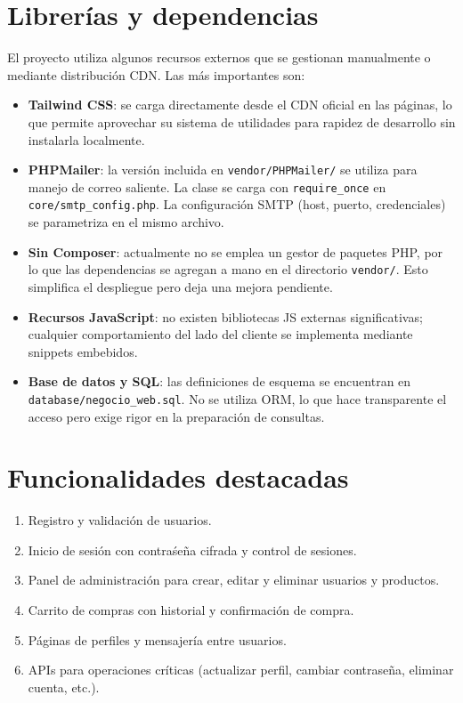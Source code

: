 \documentclass[a4paper,12pt]{article}
\begin{document}
\section{Librer\'ias y dependencias}
El proyecto utiliza algunos recursos externos que se gestionan manualmente o mediante distribuci\'on CDN. Las m\'as importantes son:
\begin{itemize}
  \item \textbf{Tailwind CSS}: se carga directamente desde el CDN oficial en las p\'aginas, lo que permite aprovechar su sistema de utilidades para rapidez de desarrollo sin instalarla localmente.
  \item \textbf{PHPMailer}: la versi\'on incluida en \texttt{vendor/PHPMailer/} se utiliza para manejo de correo saliente. La clase se carga con \texttt{require\_once} en \texttt{core/smtp\_config.php}. La configuraci\'on SMTP (host, puerto, credenciales) se parametriza en el mismo archivo.
  \item \textbf{Sin Composer}: actualmente no se emplea un gestor de paquetes PHP, por lo que las dependencias se agregan a mano en el directorio \texttt{vendor/}. Esto simplifica el despliegue pero deja una mejora pendiente.
  \item \textbf{Recursos JavaScript}: no existen bibliotecas JS externas significativas; cualquier comportamiento del lado del cliente se implementa mediante snippets embebidos.
  \item \textbf{Base de datos y SQL}: las definiciones de esquema se encuentran en \texttt{database/negocio\_web.sql}. No se utiliza ORM, lo que hace transparente el acceso pero exige rigor en la preparación de consultas.
\end{itemize}

\section{Funcionalidades destacadas}
\begin{enumerate}
  \item Registro y validaci\'on de usuarios.
  \item Inicio de sesi\'on con contra\'se\~na cifrada y control de sesiones.
  \item Panel de administraci\'on para crear, editar y eliminar usuarios y productos.
  \item Carrito de compras con historial y confirmaci\'on de compra.
  \item P\'aginas de perfiles y mensajer\'ia entre usuarios.
  \item APIs para operaciones cr\'iticas (actualizar perfil, cambiar contrase\~na, eliminar cuenta, etc.).
\end{enumerate}
\end{document}
